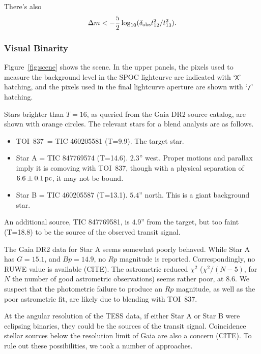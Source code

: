 \documentclass[12pt,twocolumn,tighten]{aastex62}
\newcommand{\tn}{TOI~837} %
\begin{document}
There's also
\begin{equation}
  \Delta m <
  -\frac{5}{2} \log_{10} (\delta_{\rm obs} t_{12}^2/t_{13}^2).
\end{equation}



\subsubsection{Visual Binarity}
Figure~\ref{fig:scene} shows the scene.
In the upper panels, the pixels used to measure the background level
in the SPOC lightcurve are indicated with `\texttt{X}' hatching, and
the pixels used in the final lightcurve aperture are shown with
`\texttt{/}' hatching.

Stars brighter than $T=16$, as queried from the Gaia DR2 source
catalog, are shown with orange circles.
The relevant stars for a blend analysis are as follows.
\begin{itemize}
  \item \tn\ = TIC 460205581 (T=9.9). The target star.
  \item Star A = TIC 847769574 (T=14.6). $2.3$'' west. Proper motions
    and parallax imply it is comoving with \tn, though with a physical
    separation of $6.6\pm 0.1\,{\rm pc}$, it may not be bound.
  \item Star B = TIC 460205587 (T=13.1). $5.4$'' north.  This is a
    giant background star.
\end{itemize}
An additional source, TIC 847769581, is $4.9$'' from the target, but
too faint (T=18.8) to be the source of the observed transit signal.

The Gaia DR2 data for Star A seems somewhat poorly behaved.  While
Star A has $G=15.1$, and $Bp=14.9$, no $Rp$ magnitude is reported.
Correspondingly, no RUWE value is available (CITE).  The astrometric
reduced $\chi^2$ ($\chi^2 / (N-5)$, for $N$ the number of good
astrometric observations) seems rather poor, at $8.6$.  We suspect
that the photometric failure to produce an $Rp$ magnitude, as well as
the poor astrometric fit, are likely due to blending with \tn.

At the angular resolution of the TESS data, if either Star A or Star B
were eclipsing binaries, they could be the sources of the transit
signal.  Coincidence stellar sources below the resolution limit of
Gaia are also a concern (CITE). To rule out these possibilities, we
took a number of approaches.
\end{document}
